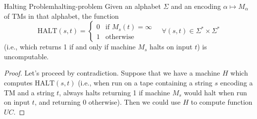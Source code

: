 \begin{theorem}{Halting Problem}{halting-problem}
    Given an alphabet \(\Sigma\) and an encoding \(\alpha \mapsto M_\alpha\) of TMs in that alphabet, the function
    \[
    \text{HALT}(s, t) =
    \begin{cases}
        0 & \text{if } M_s(t) = \infty \\
        1 & \text{otherwise}
    \end{cases}
    \quad \forall(s, t) \in \Sigma^* \times \Sigma^*
    \]
    (i.e., which returns 1 if and only if machine \(M_s\) halts on input \(t\)) is uncomputable.
    \begin{proof}
        Let's proceed by contradiction. Suppose that we have a machine \(H\) which computes \(\text{HALT}(s, t)\) (i.e., when run on a tape containing a string \(s\) encoding a TM and a string \(t\), always halts returning 1 if machine \(M_s\) would halt when run on input \(t\), and returning 0 otherwise). Then we could use \(H\) to compute function \(UC\).
        

\end{proof}
\end{theorem}

